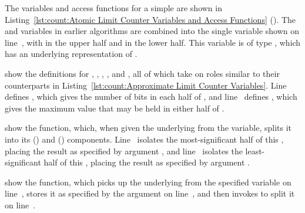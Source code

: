 \begin{fcvref}
The variables and access functions for a simple 
are shown in
Listing~\ref{lst:count:Atomic Limit Counter Variables and Access Functions}
().
The  and  variables in earlier algorithms
are combined into the single variable  shown on
line~, with  in the upper half and  in
the lower half.
This variable is of type , which has an underlying
representation of .

 show the definitions for , ,
, , and , all of which
take on roles similar to their counterparts in
Listing~\ref{lst:count:Approximate Limit Counter Variables}.
Line~ defines , which gives the number of bits in each half
of , and line~ defines , which
gives the maximum value that may be held in either half of
.
\end{fcvref}

\QuickQuizEnd

\begin{fcvref}
 show the 
function, which,
when given the underlying  from the
 variable, splits it into its
 ()
and  () components.
Line~ isolates the most-significant half of this ,
placing the result as specified by argument ,
and line~ isolates the least-significant half of this ,
placing the result as specified by argument .
\end{fcvref}

\begin{fcvref}
 show the  function, which
picks up the underlying  from the specified variable
on line~, stores it as specified by the  argument on
line~, and then invokes  to split
it on line~.
\end{fcvref}

